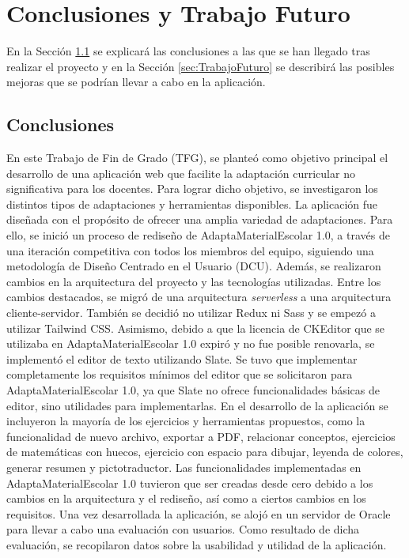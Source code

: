 \chapter{Conclusiones y Trabajo Futuro}
\label{cap:conclusiones}

En la Sección \ref{sec:conclusiones} se explicará las conclusiones a las que se han llegado tras realizar el proyecto y en la Sección \ref{sec:TrabajoFuturo} se describirá las posibles mejoras que se podrían llevar a cabo en la aplicación.

\section{Conclusiones}
\label{sec:conclusiones}
En este Trabajo de Fin de Grado (TFG), se planteó como objetivo principal el desarrollo de una aplicación web que facilite la adaptación curricular no significativa para los docentes. Para lograr dicho objetivo, se investigaron los distintos tipos de adaptaciones y herramientas disponibles. La aplicación fue diseñada con el propósito de ofrecer una amplia variedad de adaptaciones. Para ello, se inició un proceso de rediseño de AdaptaMaterialEscolar 1.0, a través de una iteración competitiva con todos los miembros del equipo, siguiendo una metodología de Diseño Centrado en el Usuario (DCU). Además, se realizaron cambios en la arquitectura del proyecto y las tecnologías utilizadas. Entre los cambios destacados, se migró de una arquitectura \textit{serverless} a una arquitectura cliente-servidor. También se decidió no utilizar Redux ni Sass y se empezó a utilizar Tailwind CSS. Asimismo, debido a que la licencia de CKEditor que se utilizaba en AdaptaMaterialEscolar 1.0 expiró y no fue posible renovarla, se implementó el editor de texto utilizando Slate. Se tuvo que implementar completamente los requisitos mínimos del editor que se solicitaron para AdaptaMaterialEscolar 1.0, ya que Slate no ofrece funcionalidades básicas de editor, sino utilidades para implementarlas. En el desarrollo de la aplicación se incluyeron la mayoría de los ejercicios y herramientas propuestos, como la funcionalidad de nuevo archivo, exportar a PDF, relacionar conceptos, ejercicios de matemáticas con huecos, ejercicio con espacio para dibujar, leyenda de colores, generar resumen y pictotraductor. Las funcionalidades implementadas en AdaptaMaterialEscolar 1.0 tuvieron que ser creadas desde cero debido a los cambios en la arquitectura y el rediseño, así como a ciertos cambios en los requisitos. Una vez desarrollada la aplicación, se alojó en un servidor de Oracle para llevar a cabo una evaluación con usuarios. Como resultado de dicha evaluación, se recopilaron datos sobre la usabilidad y utilidad de la aplicación.

